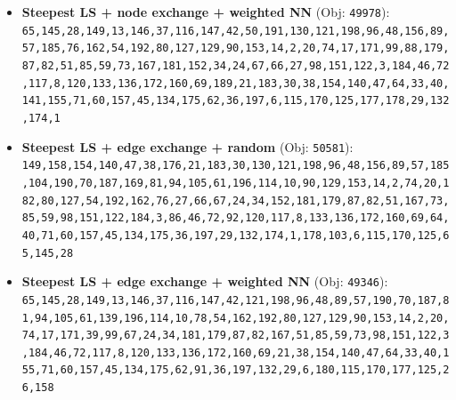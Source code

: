 \begin{itemize}[leftmargin=1.5em]
    \item \textbf{Steepest LS + node exchange + weighted NN} (Obj: \texttt{49978}):\\
    \texttt{65,145,28,149,13,146,37,116,147,42,50,191,130,121,198,96,48,156,89,57,185,76,162,54,192,80,127,129,90,153,14,2,20,74,17,171,99,88,179,87,82,51,85,59,73,167,181,152,34,24,67,66,27,98,151,122,3,184,46,72,117,8,120,133,136,172,160,69,189,21,183,30,38,154,140,47,64,33,40,141,155,71,60,157,45,134,175,62,36,197,6,115,170,125,177,178,29,132,174,1}
    \item \textbf{Steepest LS + edge exchange + random} (Obj: \texttt{50581}):\\
    \texttt{149,158,154,140,47,38,176,21,183,30,130,121,198,96,48,156,89,57,185,104,190,70,187,169,81,94,105,61,196,114,10,90,129,153,14,2,74,20,182,80,127,54,192,162,76,27,66,67,24,34,152,181,179,87,82,51,167,73,85,59,98,151,122,184,3,86,46,72,92,120,117,8,133,136,172,160,69,64,40,71,60,157,45,134,175,36,197,29,132,174,1,178,103,6,115,170,125,65,145,28}
    \item \textbf{Steepest LS + edge exchange + weighted NN} (Obj: \texttt{49346}):\\
    \texttt{65,145,28,149,13,146,37,116,147,42,121,198,96,48,89,57,190,70,187,81,94,105,61,139,196,114,10,78,54,162,192,80,127,129,90,153,14,2,20,74,17,171,39,99,67,24,34,181,179,87,82,167,51,85,59,73,98,151,122,3,184,46,72,117,8,120,133,136,172,160,69,21,38,154,140,47,64,33,40,155,71,60,157,45,134,175,62,91,36,197,132,29,6,180,115,170,177,125,26,158}
\end{itemize}

